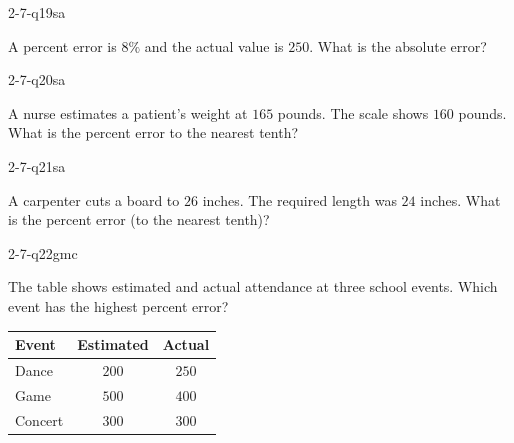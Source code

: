 \begin{practiceQuestion}{2-7-q19}{sa}
\begin{questionText}
A percent error is $8\%$ and the actual value is $250$. What is the absolute error?
\end{questionText}
\end{practiceQuestion}

\begin{practiceQuestion}{2-7-q20}{sa}
\begin{questionText}
A nurse estimates a patient's weight at $165$ pounds. The scale shows $160$ pounds. What is the percent error to the nearest tenth?
\end{questionText}
\end{practiceQuestion}

\begin{practiceQuestion}{2-7-q21}{sa}
\begin{questionText}
A carpenter cuts a board to $26$ inches. The required length was $24$ inches. What is the percent error (to the nearest tenth)?
\end{questionText}
\end{practiceQuestion}


\begin{practiceQuestion}{2-7-q22}{gmc}
\begin{questionText}
The table shows estimated and actual attendance at three school events. Which event has the highest percent error?

\begin{center}
\begin{tabular}{|l|c|c|}
\hline
\textbf{Event} & \textbf{Estimated} & \textbf{Actual} \\
\hline
Dance & $200$ & $250$ \\
\hline
Game & $500$ & $400$ \\
\hline
Concert & $300$ & $300$ \\
\hline
\end{tabular}
\end{center}
\end{questionText}
\end{practiceQuestion}

